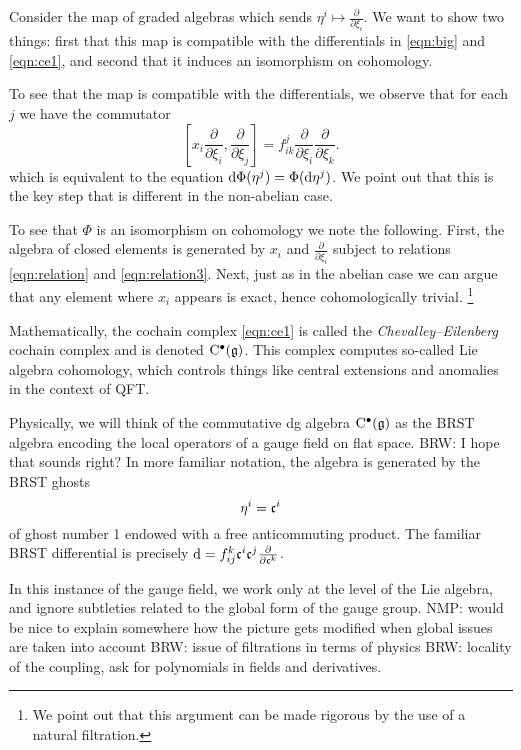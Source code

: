\documentclass[11pt]{amsart}
\def\brian#1{{\textcolor{blue!65!red}{BRW: {#1}}}}
\def\natalie#1{{\textcolor{green!65!black}{NMP: {#1}}}}
\begin{document}
Consider the map of graded algebras
\beqn\label{eqn:quasi1}
\Phi \colon \CC[\eta^i] \to \CC{}
\eeqn
which sends $\eta^i \mapsto  \frac{\partial}{\partial \xi_i}$. 
We want to show two things: first that this map is compatible with the differentials in \eqref{eqn:big} and \eqref{eqn:ce1}, and second that it induces an isomorphism on cohomology.

To see that the map is compatible with the differentials, we observe that for each $j$ we have the commutator
\[
\left[x_i \frac{\partial}{\partial \xi_i} , \frac{\partial}{\partial \xi_j}\right] = f^j_{ik} \frac{\partial}{\partial \xi_i} \frac{\partial}{\partial \xi_k} .
\]
which is equivalent to the equation ${\rm d} \Phi(\eta^j) =\Phi ({\rm d} \eta^j)$. 
We point out that this is the key step that is different in the non-abelian case. 

To see that $\Phi$ is an isomorphism on cohomology we note the following. 
First, the algebra of closed elements is generated by $x_i$ and $\frac{\partial}{\partial \xi_i}$ subject to relations \eqref{eqn:relation} and \eqref{eqn:relation3}.
Next, just as in the abelian case we can argue that any element where $x_i$ appears is exact, hence cohomologically trivial. 
\footnote{
We point out that this argument can be made rigorous by the use of a natural filtration.}  

Mathematically, the cochain complex \eqref{eqn:ce1} is called the {\em Chevalley--Eilenberg} cochain complex and is denoted ${\rm C}^\bullet(\mathfrak g)$. 
This complex computes so-called Lie algebra cohomology, which controls things like central extensions and anomalies in the context of QFT. 

Physically, we will think of the commutative dg algebra ${\rm C}^\bullet(\mathfrak g)$ as the BRST algebra encoding the local operators of a gauge field on flat space. 
\brian{I hope that sounds right?}
In more familiar notation, the algebra is generated by the BRST ghosts 
\[
\eta^i = \mathfrak c^{i}
\]
of ghost number 1 endowed with a free anticommuting product.
The familiar BRST differential is precisely ${\rm d} = f_{ij}^k \mathfrak c^i \mathfrak c^j \frac{\partial}{\partial \mathfrak c^k}$.

In this instance of the gauge field, we work only at the level of the Lie algebra, and ignore subtleties related to the global form of the gauge group. \natalie{would be nice to explain somewhere how the picture gets modified when global issues are taken into account} 
\brian{issue of filtrations in terms of physics}
\brian{locality of the coupling, ask for polynomials in fields and derivatives.}
\end{document}
